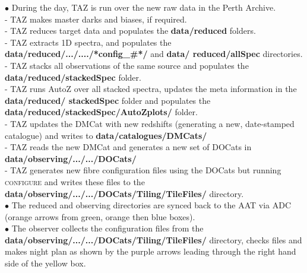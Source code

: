 \documentclass[12pt]{article}
\begin{document}
$\bullet$ During the day, TAZ is run over the new raw data in the Perth Archive. \\

\hspace{10mm} - TAZ makes master darks and biases, if required.\\

\hspace{10mm} - TAZ reduces target data and populates the \textbf{data/reduced} folders. \\

\hspace{10mm} - TAZ extracts 1D spectra, and populates the \textbf{data/reduced/.../..../*config\_\#*/} and \textbf{data/ reduced/allSpec} directories. \\

\hspace{10mm} - TAZ stacks all observations of the same source and populates the \textbf{data/reduced/stackedSpec} folder. \\

\hspace{10mm} - TAZ runs AutoZ over all stacked spectra, updates the meta information in the \textbf{data/reduced/ stackedSpec} folder and populates the \textbf{data/reduced/stackedSpec/AutoZplots/} folder. \\

\hspace{10mm} - TAZ updates the DMCat with new redshifts (generating a new, date-stamped catalogue) and writes to  \textbf{data/catalogues/DMCats/} \\

\hspace{10mm} - TAZ reads the new DMCat and generates a new set of DOCats in \textbf{data/observing/.../.../DOCats/}  \\

\hspace{10mm} - TAZ generates new fibre configuration files using the DOCats but running \textsc{configure} and writes these files to the \textbf{data/observing/.../.../DOCats/Tiling/TileFiles/} directory. \\


$\bullet$ The reduced and observing directories are synced back to the AAT via ADC (orange arrows from green, orange then blue boxes).\\

$\bullet$ The observer collects the configuration files from the \textbf{data/observing/.../.../DOCats/Tiling/TileFiles/} directory, checks files and makes night plan as shown by the purple arrows leading through the right hand side of the yellow box.\\ 
\end{document}
